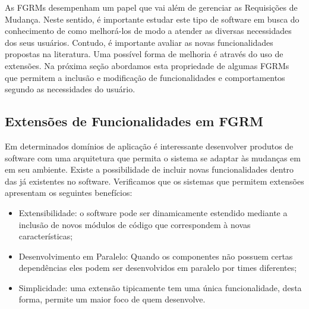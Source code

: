 

As FGRMs desempenham um papel que vai além de gerenciar as Requisições de
Mudança. Neste sentido, é importante estudar este tipo de software em busca do
conhecimento de como melhorá-los de modo a atender as diversas necessidades dos
seus usuários. Contudo, é importante avaliar as novas funcionalidades propostas
na li\-te\-ra\-tu\-ra. Uma possível forma de melhoria é através do uso de
extensões. Na próxima seção abordamos esta propriedade de algumas FGRMs que
permitem a inclusão e modificação de funcionalidades e comportamentos segundo as
necessidades do usuário.

\subsection{Extensões de Funcionalidades em FGRM}
\label{subsec:manutencao_visao_geral_extensoes_fgrm}

Em determinados domínios de aplicação é interessante desenvolver produtos de
software com uma arquitetura que permita o sistema se adaptar às mudanças em em
seu ambiente. Existe a possibilidade de incluir novas funcionalidades dentro das
já existentes no software. Verificamos que os sistemas que permitem extensões
apresentam os seguintes benefícios:

\begin{itemize}
    \item Extensibilidade: o software pode ser dinamicamente estendido mediante
        a inclusão de novos módulos de código que correspondem à novas
        características;
    \item Desenvolvimento em Paralelo: Quando os componentes não possuem certas
        dependências eles podem ser desenvolvidos em paralelo por times
        diferentes;
    \item Simplicidade: uma extensão tipicamente tem uma única funcionalidade,
        desta forma, permite um maior foco de quem desenvolve.
\end{itemize}

